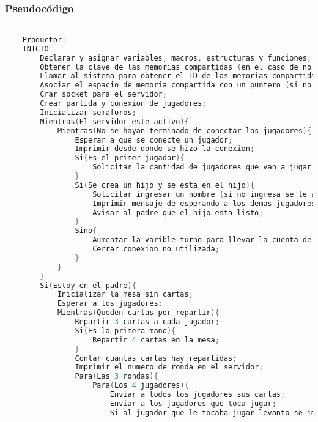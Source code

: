 \subsubsection{Pseudocódigo}

\begin{lstlisting}[language=C]          % No usar tildes en el pseudocódigo y dejar una linea vacía al principio y al final

    Productor:
    INICIO
        Declarar y asignar variables, macros, estructuras y funciones;
        Obtener la clave de las memorias compartidas (en el caso de no obtenerlas imprimir error);
        Llamar al sistema para obtener el ID de las memorias compartidas (en el caso de que no obtenerlas imprimir error);
        Asociar el espacio de memoria compartida con un puntero (si no puede asociar imprimir error);
        Crar socket para el servidor;
        Crear partida y conexion de jugadores;
        Inicializar semaforos;
        Mientras(El servidor este activo){
            Mientras(No se hayan terminado de conectar los jugadores){
                Esperar a que se conecte un jugador;
                Imprimir desde donde se hizo la conexion;
                Si(Es el primer jugador){
                    Solicitar la cantidad de jugadores que van a jugar (si no se ingresa un numero entre 2 y 4 volver a solicitar);
                }
                Si(Se crea un hijo y se esta en el hijo){
                    Solicitar ingresar un nombre (si no ingresa se le asigna un nombre por defecto);
                    Imprimir mensaje de esperando a los demas jugadores;
                    Avisar al padre que el hijo esta listo;
                }
                Sino{
                    Aumentar la varible turno para llevar la cuenta de clientes conectados;
                    Cerrar conexion no utilizada;
                }
            }
        }
        Si(Estoy en el padre){
            Inicializar la mesa sin cartas;
            Esperar a los jugadores;
            Mientras(Queden cartas por repartir){
                Repartir 3 cartas a cada jugador;
                Si(Es la primera mano){
                    Repartir 4 cartas en la mesa;
                }
                Contar cuantas cartas hay repartidas;
                Imprimir el numero de ronda en el servidor;
                Para(Las 3 rondas){
                    Para(Los 4 jugadores){
                        Enviar a todos los jugadores sus cartas;
                        Enviar a los jugadores que toca jugar;
                        Si al jugador que le tocaba jugar levanto se imprime que fue el ultimo en levantar;

\end{lstlisting}
